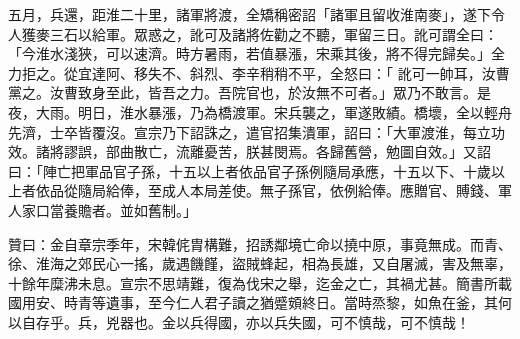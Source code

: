 \begin{pinyinscope}
 五月，兵還，距淮二十里，諸軍將渡，全矯稱密詔「諸軍且留收淮南麥」，遂下令人獲麥三石以給軍。眾惑之，訛可及諸將佐勸之不聽，軍留三日。訛可謂全曰：「今淮水淺狹，可以速濟。時方暑雨，若值暴漲，宋乘其後，將不得完歸矣。」全力拒之。從宜達阿、移失不、斜烈、李辛稍稍不平，全怒曰：「
 訛可一帥耳，汝曹黨之。汝曹致身至此，皆吾之力。吾院官也，於汝無不可者。」眾乃不敢言。是夜，大雨。明日，淮水暴漲，乃為橋渡軍。宋兵襲之，軍遂敗績。橋壞，全以輕舟先濟，士卒皆覆沒。宣宗乃下詔誅之，遣官招集潰軍，詔曰：「大軍渡淮，每立功效。諸將謬誤，部曲散亡，流離憂苦，朕甚閔焉。各歸舊營，勉圖自效。」又詔曰：「陣亡把軍品官子孫，十五以上者依品官子孫例隨局承應，十五以下、十歲以上者依品從隨局給俸，至成人本局差使。無子孫官，依例給俸。應贈官、賻錢、軍人家口當養贍者。並如舊制。」



 贊曰：金自章宗季年，宋韓侂胄構難，招誘鄰境亡命以撓中原，事竟無成。而青、徐、淮海之郊民心一搖，歲遇饑饉，盜賊蜂起，相為長雄，又自屠滅，害及無辜，十餘年糜沸未息。宣宗不思靖難，復為伐宋之舉，迄金之亡，其禍尤甚。簡書所載國用安、時青等遺事，至今仁人君子讀之猶蹙頞終日。當時烝黎，如魚在釜，其何以自存乎。兵，兇器也。金以兵得國，亦以兵失國，可不慎哉，可不慎哉！



\end{pinyinscope}